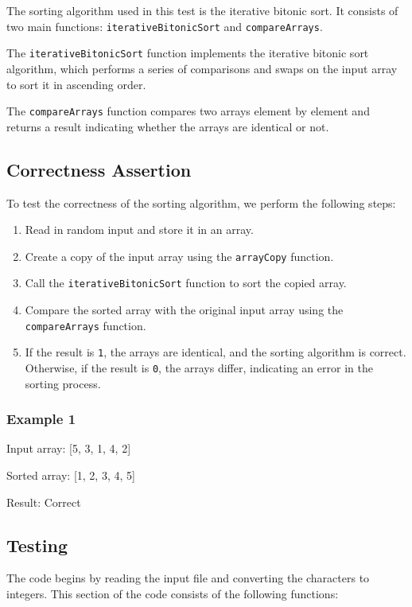The sorting algorithm used in this test is the iterative bitonic sort. It consists of two main functions: \texttt{iterativeBitonicSort} and \texttt{compareArrays}.

The \texttt{iterativeBitonicSort} function implements the iterative bitonic sort algorithm, which performs a series of comparisons and swaps on the input array to sort it in ascending order.

The \texttt{compareArrays} function compares two arrays element by element and returns a result indicating whether the arrays are identical or not.

\subsection*{Correctness Assertion}

To test the correctness of the sorting algorithm, we perform the following steps:

\begin{enumerate}
  \item Read in random input and store it in an array.
  \item Create a copy of the input array using the \texttt{arrayCopy} function.
  \item Call the \texttt{iterativeBitonicSort} function to sort the copied array.
  \item Compare the sorted array with the original input array using the \texttt{compareArrays} function.
  \item If the result is \texttt{1}, the arrays are identical, and the sorting algorithm is correct. Otherwise, if the result is \texttt{0}, the arrays differ, indicating an error in the sorting process.
\end{enumerate}

\subsubsection*{Example 1}

Input array: [5, 3, 1, 4, 2]

Sorted array: [1, 2, 3, 4, 5]

Result: Correct
\subsection*{Testing}

The code begins by reading the input file and converting the characters to integers. This section of the code consists of the following functions:

